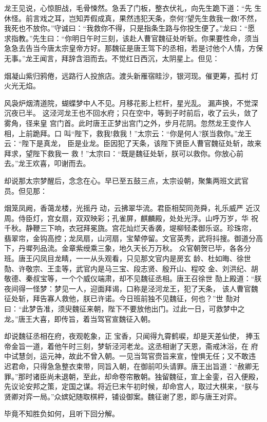 龙王见说，心惊胆战，毛骨悚然。急丢了门板，整衣伏礼，向先生跪下道：“先
生休怪。前言戏之耳，岂知弄假成真，果然违犯天条，奈何?望先生救我一救!不然，
我死也不放你。”守诚曰：“我救你不得，只是指条生路与你投生便了。”龙曰：“愿
求指教。”先生曰：“你明日午时三刻，该赴人曹官魏征处听斩。你果要性命，须当
急急去告当今唐太宗皇帝方好。那魏征是唐王驾下的丞相，若是讨他个人情，方保
无事。”龙王闻言，拜辞含泪而去。不觉红日西沉，太阴星上。但见：

烟凝山紫归鸦倦，远路行人投旅店。渡头新雁宿眭沙，银河现。催更筹，孤村
灯火光无焰。

风袅炉烟清道院，蝴蝶梦中人不见。月移花影上栏杆，星光乱。
漏声换，不觉深沉夜已半。
这泾河龙王也不回水府；只在空中，等到子时前后，收了云头，敛了雾角，径来皇
宫门首。此时唐王正梦出宫门之外，步月花阴。忽然龙王变作人相，上前跪拜。口
叫“陛下，救我!救我！”太宗云：“你是何人?朕当救你。”龙王云：“陛下是真龙，
臣是业龙。臣因犯了天条，该陛下贤臣人曹官魏征处斩，故来拜求，望陛下救我一
救！”太宗曰：“既是魏征处斩，朕可以救你。你放心前去。”龙王欢喜，叩谢而去。

却说那太宗梦醒后，念念在心。早已至五鼓三点，太宗设朝，聚集两班文武官
员。但见那：

烟笼凤阙，香蔼龙楼，光摇丹动，云拂翠华流。君臣相契同尧舜，礼乐威严
近汉周。侍臣灯，宫女扇，双双映彩；孔雀屏，麒麟殿，处处光浮。山呼万岁，华
祝千秋。静鞭三下响，衣冠拜冕旒。宫花灿烂天香袭，堤柳轻柔御乐讴。珍珠帘，
翡翠帘，金钩高控；龙凤扇，山河扇，宝辇停留。文官英秀，武将抖搜。御道分高
下，丹墀列品流。金章紫绶乘三象，地久天长万万秋。
众官朝贺已毕，各各分班。唐王闪凤目龙睛，一一从头观看，只见那文官内是房玄
龄、杜如晦、徐世𪟝、许敬宗、王圭等，武官内是马三宝、段志贤、殷开山、程咬
金、刘洪纪、胡敬德、秦叔宝等，一个个威仪端肃，却不见魏征丞相。唐王召徐世
𪟝上殿道：“朕夜间得一怪梦：梦见一人，迎面拜谒，口称是泾河龙王，犯了天条，
该人曹官魏征处斩，拜告寡人救他，朕已许诺。今日班前独不见魏征，何也？”世
𪟝对曰：“此梦告准，须臾魏征来朝，陛下不要放他出门。过此一日，可救梦中之
龙。”唐王大喜，即传旨，着当驾官宣魏征入朝。

却说魏征丞相在府，夜观乾象，正宝香，只闻得九霄鹤唳，却是天差仙使，
捧玉帝金旨一道，着他午时三刻，梦斩泾河老龙。这丞相谢了天恩，斋戒沐浴，在
府中试慧剑，运元神，故此不曾入朝。一见当驾官赍旨来宣，惶惧无任；又不敢违
迟君命，只得急急整衣束带，同旨入朝，在御前叩头请罪。唐王出旨道：“赦卿无
罪。”那时诸臣尚未退朝，至此，却命卷帘散朝。独留魏征，宣上金銮，召入便殿，
先议论安邦之策，定国之谋。将近巳末午初时候，却命宫人，取过大棋来，“朕与
贤卿对弈一局。”众嫔妃随取棋枰，铺设御案。魏征谢了恩，即与唐王对弈。

毕竟不知胜负如何，且听下回分解。